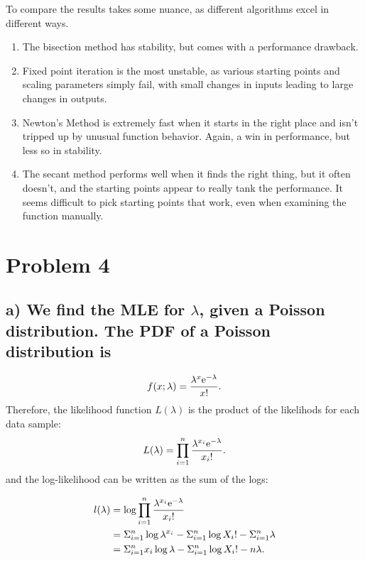 \documentclass[]{article}
\begin{document}
To compare the results takes some nuance, as different algorithms excel
in different ways.

\begin{enumerate}
\def\labelenumi{\arabic{enumi}.}
\item
  The bisection method has stability, but comes with a performance
  drawback.
\item
  Fixed point iteration is the most unstable, as various starting points
  and scaling parameters simply fail, with small changes in inputs
  leading to large changes in outputs.
\item
  Newton's Method is extremely fast when it starts in the right place
  and isn't tripped up by unusual function behavior. Again, a win in
  performance, but less so in stability.
\item
  The secant method performs well when it finds the right thing, but it
  often doesn't, and the starting points appear to really tank the
  performance. It seems difficult to pick starting points that work,
  even when examining the function manually.
\end{enumerate}

\section{Problem 4}\label{problem-4}

\subsection{\texorpdfstring{a) We find the MLE for \(\lambda\), given a
Poisson distribution. The PDF of a Poisson distribution
is}{a) We find the MLE for \textbackslash{}lambda, given a Poisson distribution. The PDF of a Poisson distribution is}}\label{a-we-find-the-mle-for-lambda-given-a-poisson-distribution.-the-pdf-of-a-poisson-distribution-is}

\[
f(x; \lambda) = \frac{\lambda^{x}\rm{e}^{-\lambda}}{x!}.
\] Therefore, the likelihood function \(L(\lambda)\) is the product of
the likelihods for each data sample: \[
  L(\lambda) = \prod_{i=1}^{n} \frac{\lambda^{x_i}\rm{e}^{-\lambda}}{x_i!}.
\] and the log-likelihood can be written as the sum of the logs:

\begin{align*}
l(\lambda) &=  \log{\prod_{i=1}^{n} \frac{\lambda^{x_i}\rm{e}^{-\lambda}}{x_i!}} \\
          &= \Sigma_{i=1}^{n} \log{\lambda^{x_i}} - \Sigma_{i=1}^{n} \log{X_i!} - \Sigma_{i=1}^{n} \lambda \\
          &=  \Sigma_{i=1}^{n} x_i \log{\lambda} - \Sigma_{i=1}^{n} \log{X_i!} - n \lambda.
\end{align*}
\end{document}
